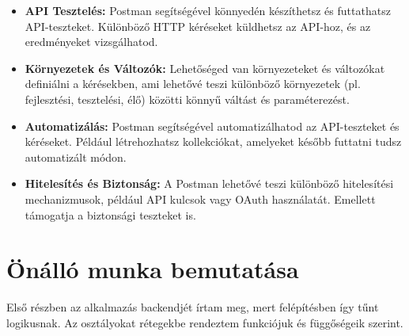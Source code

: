 \documentclass[a4paper,twoside]{article}
\begin{document}
\begin{itemize}
	\item \textbf{API Tesztelés:} Postman segítségével könnyedén készíthetsz és futtathatsz API-teszteket. Különböző HTTP kéréseket küldhetsz az API-hoz, és az eredményeket vizsgálhatod.
	\item \textbf{Környezetek és Változók:} Lehetőséged van környezeteket és változókat definiálni a kérésekben, ami lehetővé teszi különböző környezetek (pl. fejlesztési, tesztelési, élő) közötti könnyű váltást és paraméterezést.
	\item \textbf{Automatizálás:} Postman segítségével automatizálhatod az API-teszteket és kéréseket. Például létrehozhatsz kollekciókat, amelyeket később futtatni tudsz automatizált módon.
	\item \textbf{Hitelesítés és Biztonság:} A Postman lehetővé teszi különböző hitelesítési mechanizmusok, például API kulcsok vagy OAuth használatát. Emellett támogatja a biztonsági teszteket is.
\end{itemize}




\newpage



\section{Önálló munka bemutatása}
Első részben az alkalmazás backendjét írtam meg, mert felépítésben így tűnt
logikusnak. Az osztályokat rétegekbe rendeztem funkciójuk és függőségeik szerint.
\end{document}
